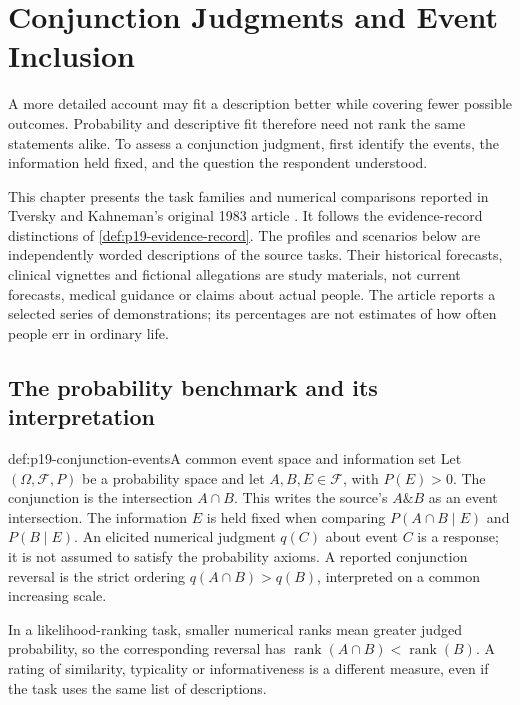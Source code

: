 \chapter{Conjunction Judgments and Event Inclusion}
\label{sec:p19-conjunction-judgments}

A more detailed account may fit a description better while covering fewer
possible outcomes. Probability and descriptive fit therefore need not
rank the same statements alike. To assess a conjunction judgment, first
identify the events, the information held fixed, and the question the
respondent understood.

This chapter presents the task families and numerical comparisons reported
in Tversky and Kahneman's original 1983 article
\cite{TverskyKahneman1983Conjunction}. It follows the evidence-record
distinctions of \cref{def:p19-evidence-record}. The profiles and scenarios
below are independently worded descriptions of the source tasks.
Their historical forecasts, clinical vignettes and fictional allegations
are study materials, not current forecasts, medical guidance or claims
about actual people. The article reports a selected series of demonstrations;
its percentages are not estimates of how often people err in ordinary life.

\section{The probability benchmark and its interpretation}
\label{sec:p19-conjunction-benchmark}

\begin{hbdefinition}{def:p19-conjunction-events}{A common event space and information set}
Let \((\Omega,\mathcal F,P)\) be a probability space and let
\(A,B,E\in\mathcal F\), with \(P(E)>0\).
The conjunction is the intersection \(A\cap B\).
This writes the source's \(A\mathbin{\&}B\) as an event intersection.
The information \(E\) is held fixed when comparing
\(P(A\cap B\mid E)\) and \(P(B\mid E)\).
An elicited numerical judgment \(q(C)\) about event \(C\) is a response;
it is not assumed to satisfy the probability axioms.
A reported conjunction reversal is the strict ordering
\(q(A\cap B)>q(B)\), interpreted on a common increasing scale.

In a likelihood-ranking task, smaller numerical ranks mean greater
judged probability, so the corresponding reversal has
\(\operatorname{rank}(A\cap B)<\operatorname{rank}(B)\).
A rating of similarity, typicality or informativeness is a different
measure, even if the task uses the same list of descriptions.
\end{hbdefinition}

